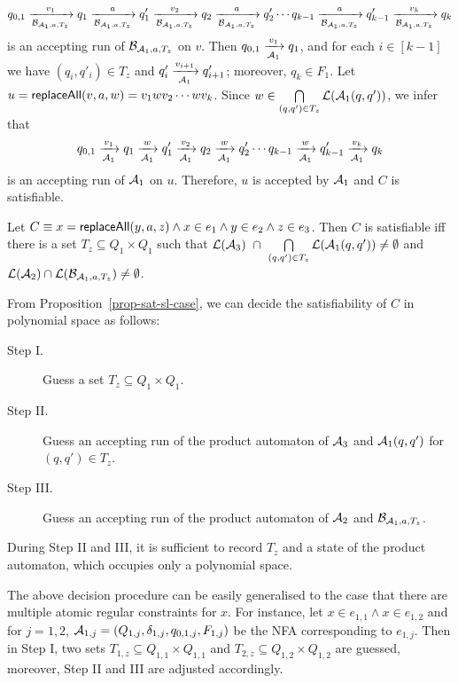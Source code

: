 $$
q_{0,1} \xrightarrow[\mathcal{B}_{\mathcal{A}_1,a,T_z}]{v_1} q_1 \xrightarrow[\mathcal{B}_{\mathcal{A}_1,a,T_z}]{a} q'_1 \xrightarrow[\mathcal{B}_{\mathcal{A}_1,a,T_z}]{v_2} q_2 \xrightarrow[\mathcal{B}_{\mathcal{A}_1,a,T_z}]{a} q'_2 \cdots q_{k-1} \xrightarrow[\mathcal{B}_{\mathcal{A}_1,a,T_z}]{a} q'_{k-1} \xrightarrow[\mathcal{B}_{\mathcal{A}_1,a,T_z}]{v_k} q_k
$$
is an accepting run of $\mathcal{B}_{\mathcal{A}_1,a,T_z}$ on $v$. Then $q_{0,1} \xrightarrow[\mathcal{A}_1]{v_1} q_1$, and for each $i \in [k-1]$ we have $(q_i, q'_i) \in T_z$ and $q'_i \xrightarrow[\mathcal{A}_1]{v_{i+1}} q'_{i+1}$; moreover, $q_k \in F_1$.
Let $u = \mathsf{replaceAll}(v, a, w)=v_1 w v_2 \cdots w v_k$. Since $w \in \bigcap \limits_{(q, q') \in T_z} \mathcal{L}(\mathcal{A}_1(q, q'))$,  we infer that
$$
q_{0,1} \xrightarrow[\mathcal{A}_1]{v_1} q_1 \xrightarrow[\mathcal{A}_1]{w} q'_1 \xrightarrow[\mathcal{A}_1]{v_2} q_2 \xrightarrow[\mathcal{A}_1]{w} q'_2 \cdots q_{k-1} \xrightarrow[\mathcal{A}_1]{w} q'_{k-1} \xrightarrow[\mathcal{A}_1]{v_k} q_k
$$
is an accepting run of $\mathcal{A}_1$ on $u$. Therefore, $u$ is accepted by $\mathcal{A}_1$ and $C$ is satisfiable.

\begin{proposition}\label{prop-sat-sl-case}
Let $C \equiv x = \mathsf{replaceAll}(y, a, z) \wedge x \in e_1 \wedge y \in e_2 \wedge z \in e_3$. Then $C$ is satisfiable iff there is a set $T_{z} \subseteq Q_1 \times Q_1$ such that $\mathcal{L}(\mathcal{A}_3)\ \cap\ \bigcap \limits_{(q, q') \in T_z} \mathcal{L}(\mathcal{A}_1(q, q')) \neq \emptyset$ and $ \mathcal{L}(\mathcal{A}_2) \cap \mathcal{L}(\mathcal{B}_{\mathcal{A}_1,a,T_z}) \neq \emptyset$.
\end{proposition}

From Proposition~\ref{prop-sat-sl-case}, we can decide the satisfiability of $C$ in polynomial space as follows:
\begin{description}
\item[Step I.] Guess a set $T_{z} \subseteq Q_1 \times Q_1$.
%
\item[Step II.] Guess an accepting run of the product automaton of $\mathcal{A}_3$ and $\mathcal{A}_1(q, q')$ for $(q,q') \in T_{z}$.
%
\item[Step III.] Guess an accepting run of the product automaton of $\mathcal{A}_2$ and $\mathcal{B}_{\mathcal{A}_1, a,  T_{z}}$.
\end{description}
During Step II and III, it is sufficient to record $T_z$ and a state of the product automaton, which occupies only a polynomial space.

The above decision procedure can be easily generalised to the case that there are multiple atomic regular constraints for $x$. For instance, let $x \in e_{1,1} \wedge x \in e_{1,2}$ and for $j = 1, 2$, $\mathcal{A}_{1,j} = (Q_{1,j}, \delta_{1, j}, q_{0,1, j}, F_{1,j})$ be
the NFA corresponding to $e_{1,j}$. Then in Step I, two sets $T_{1,z} \subseteq Q_{1,1} \times Q_{1,1}$ and $T_{2,z} \subseteq Q_{1,2} \times Q_{1,2}$ are guessed, moreover, Step II and III are adjusted accordingly.

